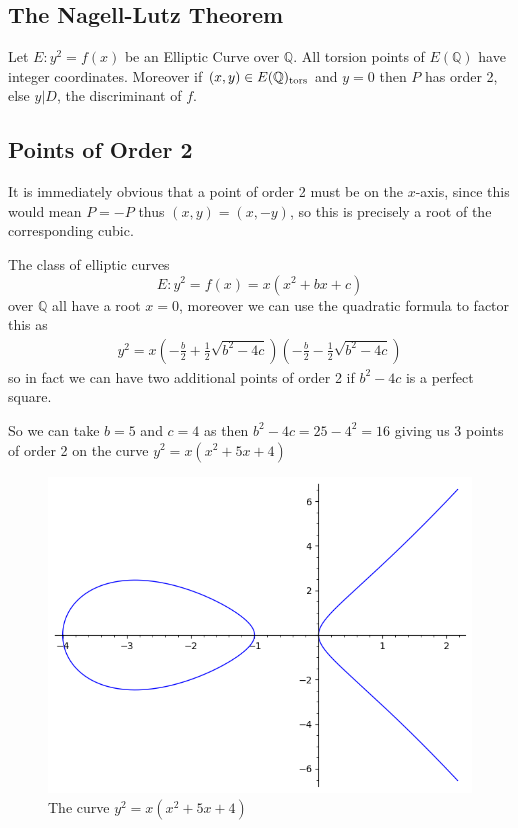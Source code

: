 \subsection{The Nagell-Lutz Theorem}%
\label{sub:the_nagell_lutz_theorem}
\begin{theorem} \label{thm:nagellLutz}
  Let $E: y^2 = f(x)$ be an Elliptic Curve over $\mathbb{Q}$.
  All torsion points of $E(\mathbb{Q})$ have integer coordinates.
  Moreover if $(x,y) \in E(\mathbb{Q})_{\operatorname{tors}}$
  and $y = 0$ then $P$ has order 2, else $y|D$,
  the discriminant of $f$.
\end{theorem}

\subsection{Points of Order 2}%
\label{sub:points_of_order_2}
It is immediately obvious that a point of order 2 must be on the $x$-axis,
since this would mean $P = -P$ thus $(x,y) = (x, -y)$, so this is precisely
a root of the corresponding cubic.
\begin{example} \label{ex:pointsOfOrder2}
  The class of elliptic curves
  \[ E: y^2 = f(x) = x(x^2 + bx + c) \]
  over $\mathbb{Q}$
  all have a root $x = 0$, moreover we can use
  the quadratic formula to factor this as
  \begin{align*}
    y^2 = x \left( - \frac{b}{2} + \frac{1}{2} \sqrt{b^2 - 4c}   \right)
    \left(- \frac{b}{2} - \frac{1}{2} \sqrt{b^2 - 4c} \right)
  \end{align*}
  so in fact we can have two additional points of order 2
  if $b^2 - 4c$ is a perfect square.

  So we can take $b = 5$ and $c = 4$ as then $b^2 - 4c = 25 - 4^2 = 16$
  giving us 3 points of order 2 on the curve $y^2 = x(x^2 + 5x + 4)$
  \begin{figure}[h]
    \centering
    \includegraphics[width=0.4\linewidth]{pointsOfFiniteOrder/order2.png}
    \caption{The curve $y^2 = x(x^2 + 5x + 4)$}%
    \label{fig:order2}
  \end{figure}
\end{example}


